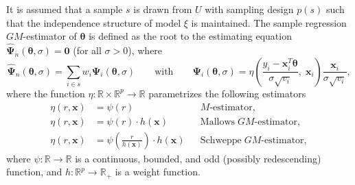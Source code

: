 \documentclass[a4paper,oneside,11pt,DIV=12]{scrartcl}
\theoremstyle{remark}
\newcommand{\R}{\mathbb{R}}
\begin{document}
It is assumed that a sample $s$ is drawn from $U$ with sampling design $p(s)$
such that the independence structure of model $\xi$ is maintained. The sample
regression $GM$-estimator of $\bm{\theta}$ is defined as the root to
the estimating equation $\widehat{\bm{\Psi}}_n(\bm{\theta},
\sigma) = \bm 0$ (for all $\sigma > 0$), where
\begin{equation*}
    \widehat{\bm{\Psi}}_n(\bm{\theta}, \sigma) = \sum_{i \in s}
    w_i \bm{\Psi}_i(\bm{\theta}, \sigma) \qquad \text{with}
    \qquad \bm{\Psi}_i(\bm{\theta}, \sigma) =
    \eta\left(\frac{y_i - \bm x_i^T \bm{\theta}}{\sigma \sqrt{v_i}},
    \; \bm x_i\right) \frac{\bm x_i}{\sigma \sqrt{v_i}},
\end{equation*}
\noindent where the function $\eta: \R \times \R^p \rightarrow \R$ parametrizes
the following estimators
\begin{align*}
    \eta(r,\bm x) &= \psi(r) && M\text{-estimator},\\
    \eta(r,\bm x) &=\psi(r) \cdot h(\bm x) && \text{Mallows}\;
    GM\text{-estimator},\\
    \eta(r,\bm x) &= \psi\left(\displaystyle{\frac{r}{h(\bm x)}}\right)
    \cdot h(\bm x) && \text{Schweppe}\; GM\text{-estimator},
\end{align*}
\noindent where $\psi:\R \rightarrow \R$ is a continuous, bounded, and odd
(possibly redescending) function, and $h: \R^p \rightarrow \R_+$ is a weight
function.

\end{document}
